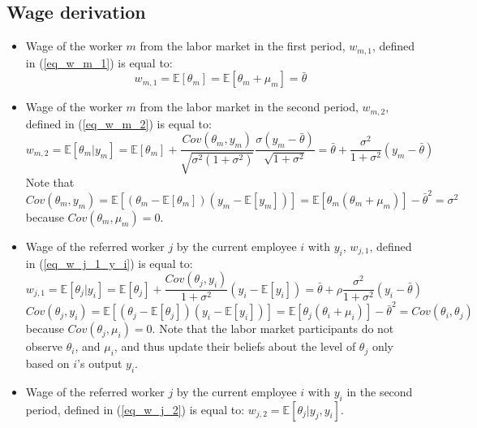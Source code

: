 \documentclass[12pt]{article}
\begin{document}
\subsection*{Wage derivation}
\begin{itemize}
    \item Wage of the worker $m$ from the labor market in the first period, $w_{m,1}$, defined in (\ref{eq_w_m_1}) is equal to:
    \begin{equation*}
    w_{m,1} = \mathbb{E}[\theta_{m}] = \mathbb{E}[\theta_m + \mu_m] = \bar{\theta}
    \end{equation*}
    
    \item Wage of the worker $m$ from the labor market in the second period, $w_{m,2}$, defined in (\ref{eq_w_m_2}) is equal to:
    \begin{equation*}
    w_{m,2} = \mathbb{E}[\theta_{m}|y_{m}] = \mathbb{E}[\theta_{m}] + \frac{Cov(\theta_m, y_m)}{\sqrt{\sigma^2(1+\sigma^2)}}\frac{\sigma(y_m - \bar{\theta})}{\sqrt{1+\sigma^2}} = \bar{\theta} + \frac{\sigma^2}{1+\sigma^2}(y_m - \bar{\theta})
    \end{equation*}
    Note that $Cov(\theta_m, y_m) = \mathbb{E}[(\theta_m - \mathbb{E}[\theta_m])(y_m - \mathbb{E}[y_m])] = \mathbb{E}[\theta_m(\theta_m + \mu_m)]-\bar{\theta}^2 = \sigma^2$ because $Cov(\theta_m,\mu_m) = 0$.
    
    \item Wage of the referred worker $j$ by the current employee $i$ with $y_i$, $w_{j,1}$, defined in (\ref{eq_w_j_1_y_i}) is equal to:
    \begin{equation}\label{eq_w_j_1}
    w_{j,1} = \mathbb{E}[\theta_{j}|y_{i}] = \mathbb{E}[\theta_j]+ \frac{Cov(\theta_j,y_i)}{1+\sigma^2}\left(y_i - \mathbb{E}[y_i]\right) = \bar{\theta}+\rho\frac{\sigma^2}{1+\sigma^2}(y_i-\bar{\theta})
    \end{equation}
    $Cov(\theta_j, y_i) = \mathbb{E}[(\theta_j - \mathbb{E}[\theta_j])(y_i - \mathbb{E}[y_i])] = \mathbb{E}[\theta_j(\theta_i + \mu_i)]-\bar{\theta}^2 = Cov(\theta_i,\theta_j)$ because $Cov(\theta_j,\mu_i) = 0$.
    Note that the labor market participants do not observe $\theta_i$, and $\mu_i$, and thus update their beliefs about the level of $\theta_j$ only based on $i$'s output $y_i$.
    
    \item Wage of the referred worker $j$ by the current employee $i$ with $y_i$ in the second period, defined in (\ref{eq_w_j_2}) is equal to: $w_{j,2} = \mathbb{E}[\theta_j|y_j,y_i]$. 
    

\end{itemize}
\end{document}
